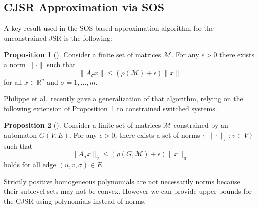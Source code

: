 \documentclass{sig-alternate-05-2015}
\newcommand{\1}{\mathbf{1}}
\theoremstyle{definition}
\newtheorem{myprop}{Proposition}
\newcommand{\R}{\mathbb{R}}
\newcommand{\Rn}{\R^n}
\newcommand{\A}{\mathcal{M}}
\newcommand{\G}{G}
\newcommand{\jsr}{\rho(\A)}
\newcommand{\cjsr}{\rho(\G,\A)}
\newcommand{\witch}{witched}
\newcommand{\Nodes}{V}
\newcommand{\Arcs}{E}
\newcommand{\arc}{edge}
\newcommand{\defAGe  }{a finite set of matrices $\A$ constrained by an automaton $\G(\Nodes,\Arcs)$}
\begin{document}
\subsection{CJSR Approximation via SOS}
\label{sec:sos}
A key result used in the SOS-based approximation algorithm for the unconstrained JSR \cite{parrilo2008approximation} is the following:
\begin{myprop}[{\cite[Proposition~1]{rota1960note}}]
  \label{prop:norm}
  Consider a finite set of matrices $\A$.
  For any $\epsilon > 0$ there exists a norm $\|\cdot\|$ such that
  \[ \|A_\sigma x\| \leq (\jsr+\epsilon)\|x\| \]
  for all $x \in \Rn$ and $\sigma = 1, \ldots, m$.
\end{myprop}

Philippe et al.\  recently gave a generalization of that algorithm, relying on the following extension of Proposition~\ref{prop:norm} to constrained s\witch{} systems.

\vfill\eject
\begin{myprop}[{\cite[Proposition~2.2]{philippe2015stability}}]
  \label{prop:multinorm}
  Consider \defAGe{}.
  For any $\epsilon > 0$, there exists a set of norms $\{\, \|\cdot\|_v : v \in \Nodes \,\}$
  such that
  \[ \|A_\sigma x\|_{v} \leq (\cjsr + \epsilon) \|x\|_{u} \]
  holds for all \arc{} $(u,v,\sigma) \in \Arcs$.
\end{myprop}

Strictly positive homogeneous polynomials are not necessarily norms because their sublevel sets may not be convex.
However we can provide upper bounds for the CJSR using polynomials instead of norms.
\end{document}
